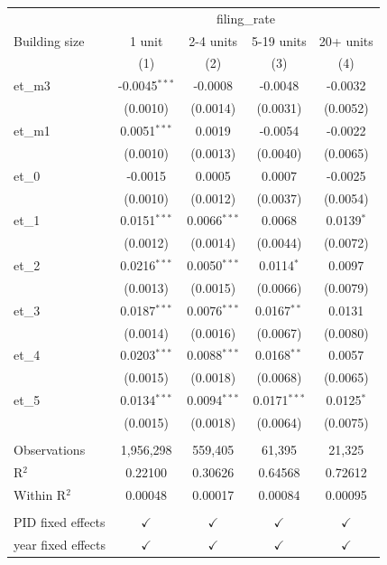 
\begingroup
\centering
\begin{tabular}{lcccc}
   \toprule
    & \multicolumn{4}{c}{filing\_rate}\\
   Building size      & 1 unit          & 2-4 units      & 5-19 units     & 20+ units \\   
                      & (1)             & (2)            & (3)            & (4)\\  
   \midrule 
   et\_m3             & -0.0045$^{***}$ & -0.0008        & -0.0048        & -0.0032\\   
                      & (0.0010)        & (0.0014)       & (0.0031)       & (0.0052)\\   
   et\_m1             & 0.0051$^{***}$  & 0.0019         & -0.0054        & -0.0022\\   
                      & (0.0010)        & (0.0013)       & (0.0040)       & (0.0065)\\   
   et\_0              & -0.0015         & 0.0005         & 0.0007         & -0.0025\\   
                      & (0.0010)        & (0.0012)       & (0.0037)       & (0.0054)\\   
   et\_1              & 0.0151$^{***}$  & 0.0066$^{***}$ & 0.0068         & 0.0139$^{*}$\\   
                      & (0.0012)        & (0.0014)       & (0.0044)       & (0.0072)\\   
   et\_2              & 0.0216$^{***}$  & 0.0050$^{***}$ & 0.0114$^{*}$   & 0.0097\\   
                      & (0.0013)        & (0.0015)       & (0.0066)       & (0.0079)\\   
   et\_3              & 0.0187$^{***}$  & 0.0076$^{***}$ & 0.0167$^{**}$  & 0.0131\\   
                      & (0.0014)        & (0.0016)       & (0.0067)       & (0.0080)\\   
   et\_4              & 0.0203$^{***}$  & 0.0088$^{***}$ & 0.0168$^{**}$  & 0.0057\\   
                      & (0.0015)        & (0.0018)       & (0.0068)       & (0.0065)\\   
   et\_5              & 0.0134$^{***}$  & 0.0094$^{***}$ & 0.0171$^{***}$ & 0.0125$^{*}$\\   
                      & (0.0015)        & (0.0018)       & (0.0064)       & (0.0075)\\   
    \\
   Observations       & 1,956,298       & 559,405        & 61,395         & 21,325\\  
   R$^2$              & 0.22100         & 0.30626        & 0.64568        & 0.72612\\  
   Within R$^2$       & 0.00048         & 0.00017        & 0.00084        & 0.00095\\  
    \\
   PID fixed effects  & $\checkmark$    & $\checkmark$   & $\checkmark$   & $\checkmark$\\   
   year fixed effects & $\checkmark$    & $\checkmark$   & $\checkmark$   & $\checkmark$\\   
   \bottomrule
\end{tabular}
\par\endgroup


